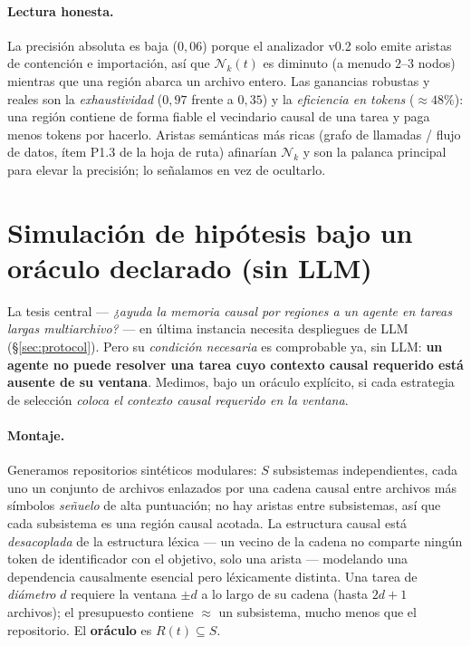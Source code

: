 \documentclass[11pt]{article}
\newcommand{\Nk}{\mathcal{N}_k}
\begin{document}
\paragraph{Lectura honesta.} La precisión absoluta es baja ($0{,}06$) porque el
analizador v0.2 solo emite aristas de contención e importación, así que $\Nk(t)$ es
diminuto (a menudo $2$--$3$ nodos) mientras que una región abarca un archivo entero.
Las ganancias robustas y reales son la \emph{exhaustividad} ($0{,}97$ frente a
$0{,}35$) y la \emph{eficiencia en tokens} ($\approx\!48\%$): una región contiene de
forma fiable el vecindario causal de una tarea y paga menos tokens por hacerlo.
Aristas semánticas más ricas (grafo de llamadas / flujo de datos, ítem P1.3 de la hoja
de ruta) afinarían $\Nk$ y son la palanca principal para elevar la precisión; lo
señalamos en vez de ocultarlo.

\section{Simulación de hipótesis bajo un oráculo declarado (sin LLM)}\label{sec:sim}

La tesis central --- \emph{¿ayuda la memoria causal por regiones a un agente en
tareas largas multiarchivo?} --- en última instancia necesita despliegues de LLM
(\S\ref{sec:protocol}). Pero su \emph{condición necesaria} es comprobable ya, sin LLM:
\textbf{un agente no puede resolver una tarea cuyo contexto causal requerido está
ausente de su ventana}. Medimos, bajo un oráculo explícito, si cada estrategia de
selección \emph{coloca el contexto causal requerido en la ventana}.

\paragraph{Montaje.} Generamos repositorios sintéticos modulares: $S$ subsistemas
independientes, cada uno un conjunto de archivos enlazados por una cadena causal entre
archivos más símbolos \emph{señuelo} de alta puntuación; no hay aristas entre
subsistemas, así que cada subsistema es una región causal acotada. La estructura causal
está \emph{desacoplada} de la estructura léxica --- un vecino de la cadena no comparte
ningún token de identificador con el objetivo, solo una arista --- modelando una
dependencia causalmente esencial pero léxicamente distinta. Una tarea de \emph{diámetro}
$d$ requiere la ventana $\pm d$ a lo largo de su cadena (hasta $2d{+}1$ archivos); el
presupuesto contiene $\approx$ un subsistema, mucho menos que el repositorio. El
\textbf{oráculo} es $R(t)\subseteq S$.
\end{document}
